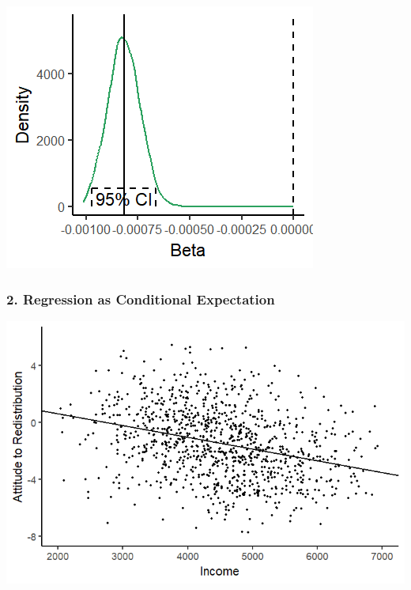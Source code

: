\documentclass[xcolor=x11names,compress]{beamer}\usepackage[]{graphicx}\usepackage[]{color}
\makeatletter
\def\maxwidth{ %
  \ifdim\Gin@nat@width>\linewidth
    \linewidth
  \else
    \Gin@nat@width
  \fi
}
\newenvironment{knitrout}{}{} %
\renewcommand{\(}{\begin{columns}}
\renewcommand{\)}{\end{columns}}
\newcommand{\<}[1]{\begin{column}{#1}}
\renewcommand{\>}{\end{column}}
\makeatother
\begin{document}
\begin{frame}
\begin{multicols}{2}
\columnbreak
\begin{knitrout}
\color{fgcolor}
\includegraphics[width=\maxwidth]{figure/beta_dist_4-1} 

\end{knitrout}
\end{multicols}
\end{frame}

\begin{frame}
\frametitle{2. Regression as Conditional Expectation}
\begin{knitrout}
\color{fgcolor}
\includegraphics[width=\maxwidth]{figure/cond_exp1d-1} 

\end{knitrout}
\end{frame}
\end{document}
